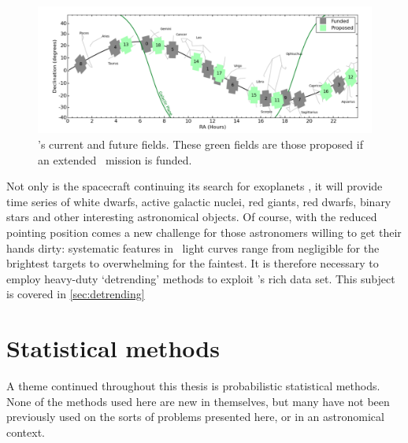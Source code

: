 \begin{figure}[p]
\begin{center}
\includegraphics[width=6in, clip=true]{figures/Future_K2_fields.pdf}
\caption[Future \ktwo\ fields]{\ktwo's current and future fields. These green
fields are those proposed if an extended \ktwo\ mission is funded.}
\label{fig:future_fields}
\end{center}
\end{figure}

Not only is the spacecraft continuing its search for exoplanets \citep[and has
already discovered many, \eg][]{Vanderburg2015, Crossfield2015,
Foreman-Mackey2015, Montet2015, Becker2015, Vanderburg2016}, it will
provide time series of white dwarfs, active galactic nuclei, red giants, red
dwarfs, binary stars and other interesting astronomical objects.
Of course, with the reduced pointing position comes a new challenge for those
astronomers willing to get their hands dirty: systematic features in \ktwo\
light curves range from negligible for the brightest targets to overwhelming
for the faintest.
It is therefore necessary to employ heavy-duty `detrending' methods to
exploit \ktwo's rich data set.
This subject is covered in \textsection \ref{sec:detrending}

\section{Statistical methods}

A theme continued throughout this thesis is probabilistic statistical methods.
None of the methods used here are new in themselves, but many have not been
previously used on the sorts of problems presented here, or in an astronomical
context.

